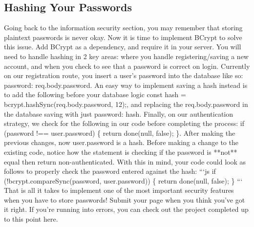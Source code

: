 \documentclass{article}%
\begin{document}
\subsection{Hashing Your Passwords}%
\label{subsec:HashingYourPasswords}%
Going back to the information security section, you may remember that storing plaintext passwords is never okay. Now it is time to implement BCrypt to solve this issue.\newline%
Add BCrypt as a dependency, and require it in your server. You will need to handle hashing in 2 key areas: where you handle registering/saving a new account, and when you check to see that a password is correct on login.\newline%
Currently on our registration route, you insert a user's password into the database like so: password: req.body.password. An easy way to implement saving a hash instead is to add the following before your database logic const hash = bcrypt.hashSync(req.body.password, 12);, and replacing the req.body.password in the database saving with just password: hash.\newline%
Finally, on our authentication strategy, we check for the following in our code before completing the process: if (password !== user.password) \{ return done(null, false); \}. After making the previous changes, now user.password is a hash. Before making a change to the existing code, notice how the statement is checking if the password is **not** equal then return non{-}authenticated. With this in mind, your code could look as follows to properly check the password entered against the hash:\newline%
```js\newline%
if (!bcrypt.compareSync(password, user.password)) \{ \newline%
  return done(null, false);\newline%
\}\newline%
```\newline%
That is all it takes to implement one of the most important security features when you have to store passwords!\newline%
Submit your page when you think you've got it right. If you're running into errors, you can check out the project completed up to this point here.\newline%

%
\end{document}
